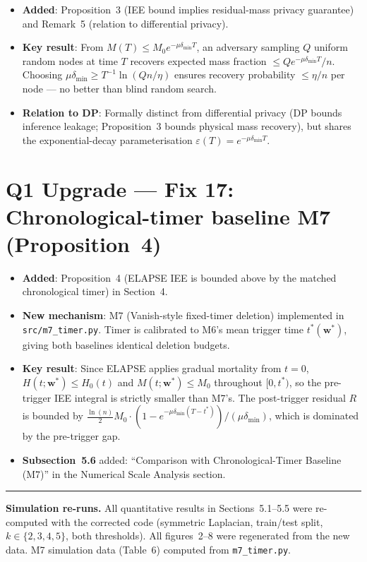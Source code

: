 \documentclass[11pt,a4paper]{article}
\begin{document}
\begin{itemize}
\item \textbf{Added}: Proposition~3 (IEE bound implies residual-mass privacy
  guarantee) and Remark~5 (relation to differential privacy).
\item \textbf{Key result}: From $M(T) \leq M_0 e^{-\mu\delta_{\min}T}$,
  an adversary sampling $Q$ uniform random nodes at time $T$ recovers
  expected mass fraction $\leq Qe^{-\mu\delta_{\min}T}/n$.
  Choosing $\mu\delta_{\min} \geq T^{-1}\ln(Qn/\eta)$ ensures recovery
  probability $\leq \eta/n$ per node — no better than blind random search.
\item \textbf{Relation to DP}: Formally distinct from differential privacy
  (DP bounds inference leakage; Proposition~3 bounds physical mass recovery),
  but shares the exponential-decay parameterisation $\varepsilon(T)=e^{-\mu\delta_{\min}T}$.
\end{itemize}

\section*{Q1 Upgrade — Fix 17: Chronological-timer baseline M7 (Proposition~4)}

\begin{itemize}
\item \textbf{Added}: Proposition~4 (ELAPSE IEE is bounded above by the
  matched chronological timer) in Section~4.
\item \textbf{New mechanism}: M7 (Vanish-style fixed-timer deletion) implemented
  in \texttt{src/m7\_timer.py}.  Timer is calibrated to M6's mean trigger time
  $t^*(\mathbf{w}^*)$, giving both baselines identical deletion budgets.
\item \textbf{Key result}: Since ELAPSE applies gradual mortality from $t=0$,
  $H(t;\mathbf{w}^*) \leq H_0(t)$ and $M(t;\mathbf{w}^*) \leq M_0$ throughout
  $[0,t^*)$, so the pre-trigger IEE integral is strictly smaller than M7's.
  The post-trigger residual $R$ is bounded by $\frac{\ln(n)}{2}M_0 \cdot
  (1-e^{-\mu\delta_{\min}(T-t^*)})/(\mu\delta_{\min})$, which is dominated
  by the pre-trigger gap.
\item \textbf{Subsection~5.6} added: ``Comparison with Chronological-Timer
  Baseline (M7)'' in the Numerical Scale Analysis section.
\end{itemize}

\bigskip
\noindent\rule{\linewidth}{0.4pt}

\noindent\textbf{Simulation re-runs.} All quantitative results in
Sections~5.1--5.5 were re-computed with the corrected code (symmetric
Laplacian, train/test split, $k\in\{2,3,4,5\}$, both thresholds).
All figures~2--8 were regenerated from the new data.
M7 simulation data (Table~6) computed from \texttt{m7\_timer.py}.
\end{document}
